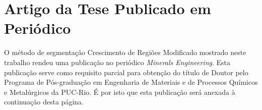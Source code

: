 
\appendix
\chapter{Artigo da Tese Publicado em Periódico}

O método de segmentação Crescimento de Regiões Modificado mostrado neste
trabalho rendeu uma publicação no periódico \textit{Minerals
  Engineering}. Esta publicação serve como requisito parcial para
obtenção do título de Doutor pelo Programa de Pós-graduação em
Engenharia de Materiais e de Processos Químicos e Metalúrgicos da
PUC-Rio. É por isto que esta publicação será anexada à continuação desta
página.

